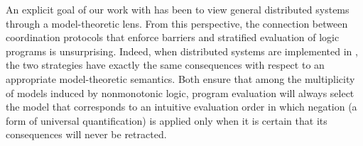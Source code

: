 An explicit goal of our work with \lang has been to view general distributed
systems through a model-theoretic lens.  From this perspective, the connection
between coordination protocols that enforce barriers and stratified evaluation
of logic programs is unsurprising.  Indeed, when distributed systems are
implemented in \plang, the two strategies have exactly the same consequences
with respect to an appropriate model-theoretic semantics.  Both ensure that among
the multiplicity of models induced by nonmonotonic logic, program evaluation
will always select the model that corresponds to an intuitive evaluation order
in which negation (a form of universal quantification) is applied only when it
is certain that its consequences will never be retracted.



